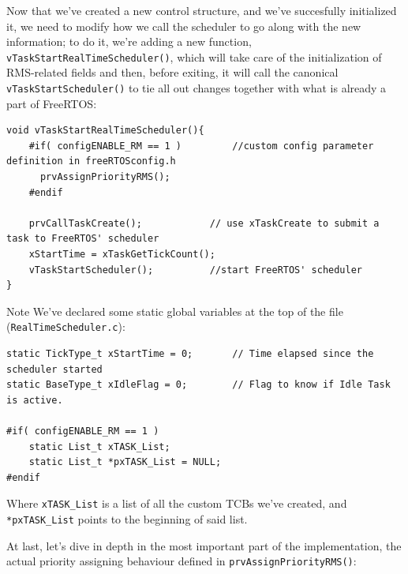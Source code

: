 \documentclass[10pt]{article}
\begin{document}
Now that we've created a new control structure, and we've succesfully initialized it, we need to modify how we call the scheduler to go along with the new information; to do it, we're adding a new function, \verb|vTaskStartRealTimeScheduler()|, which will take care of the initialization of RMS-related fields and then, before exiting, it will call the canonical \verb|vTaskStartScheduler()| to tie all out changes together with what is already a part of FreeRTOS:
\begin{lstlisting}
void vTaskStartRealTimeScheduler(){
    #if( configENABLE_RM == 1 )			//custom config parameter definition in freeRTOSconfig.h
      prvAssignPriorityRMS();
    #endif

    prvCallTaskCreate();			// use xTaskCreate to submit a task to FreeRTOS' scheduler
    xStartTime = xTaskGetTickCount();
    vTaskStartScheduler();			//start FreeRTOS' scheduler
}
\end{lstlisting}

\begin{example}{Note}
We've declared some static global variables at the top of the file (\verb|RealTimeScheduler.c|):
\begin{lstlisting}
static TickType_t xStartTime = 0;       // Time elapsed since the scheduler started
static BaseType_t xIdleFlag = 0;        // Flag to know if Idle Task is active.

#if( configENABLE_RM == 1 )
    static List_t xTASK_List;
    static List_t *pxTASK_List = NULL;
#endif
\end{lstlisting}
Where \verb|xTASK_List| is a list of all the custom TCBs we've created, and \verb|*pxTASK_List| points to the beginning of said list.\\
\end{example}
\newpage
At last, let's dive in depth in the most important part of the implementation, the actual priority assigning behaviour defined in \verb|prvAssignPriorityRMS()|:
\end{document}
